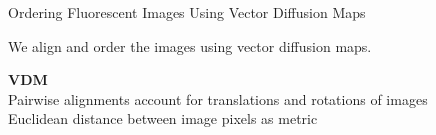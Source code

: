 \begin{frame}{Ordering Fluorescent Images Using Vector Diffusion Maps}

	\centering
    We align and order the images using vector diffusion maps.
    \vspace{0.1in}

	\drawunordered
    
    \drawdownarrow
    	
    \begin{minipage}{0.8\textwidth}
    \centering
	{\scriptsize {\bf VDM} \\Pairwise alignments account for translations and rotations of images \\ Euclidean distance between image pixels as metric \par}
    \end{minipage}
    
    \drawdownarrow
    
		
    
    
\end{frame}

